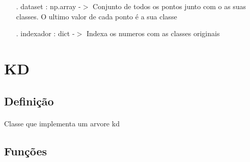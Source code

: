 \documentclass{article}
\begin{document}
\begin{enumerate}

\item[.] dataset : np.array -$>$ Conjunto de todos os pontos junto com o as suas classes. O ultimo valor de cada ponto é a sua classe
\item[.] indexador : dict -$>$ Indexa os numeros com as classes originais

\end{enumerate}



\section{KD} 

\subsection{Definição}

\paragraph{} Classe que implementa um arvore kd

\subsection{Funções}
\end{document}
